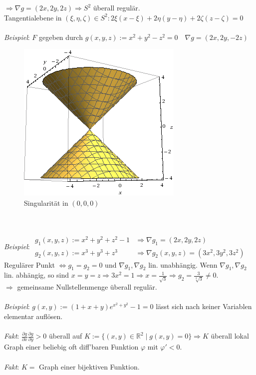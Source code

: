\documentclass[12pt,a4paper,titlepage]{article}
\renewcommand{\d}{\partial}
\newcommand{\setR}{\mathbb{R}}
\begin{document}
$\Rightarrow \nabla g=(2x,2y,2z) \Rightarrow S^2$ überall regulär. \\
Tangentialebene in $(\xi,\eta,\zeta)\in S^2: 2\xi(x-\xi)+2\eta(y-\eta)+2\zeta(z-\zeta)=0$ \\
\\
\newpage
\textit{Beispiel}: $F$ gegeben durch $g(x,y,z):=x^2+y^2-z^2=0 \quad \nabla g=(2x,2y,-2z)$
\begin{figure}[h!]
  \centering
  \includegraphics[keepaspectratio=true,scale=0.6]{WolframAlpha--plot_x_2_y_2_z_2_0__Surface_plot__2014_03_27_0446.png}
  \caption{Singularität in $(0,0,0)$}
\end{figure}\\
\\
\textit{Beispiel}: $\begin{array}{ll}g_1(x,y,z):=x^2+y^2+z^2-1 & \Rightarrow \nabla g_1=(2x,2y,2z)\\
  g_2(x,y,z):=x^3+y^3+z^3 & \Rightarrow \nabla g_2(x,y,z)=(3x^2,3y^2,3z^2)
\end{array}$ \\
Regulärer Punkt $\iff g_1=g_2=0$ und $\nabla g_1,\nabla g_2$ lin. unabhängig. Wenn $\nabla g_1,\nabla g_2$ lin. abhängig, so sind $x=y=z \Rightarrow 3x^2=1 \Rightarrow x=\frac{1}{\sqrt{3}} \Rightarrow g_2=\frac{3}{\sqrt[3]{3}}\neq 0$. \\
$\Rightarrow$ gemeinsame Nullstellenmenge überall regulär. \\
\\
\textit{Beispiel}: $g(x,y):=(1+x+y)e^{x^2+y^2}-1=0$ lässt sich nach keiner Variablen elementar auflösen. \\
\\
\textit{Fakt}: $\frac{\d g}{\d x}\frac{\d g}{\d y}>0$ überall auf $K:=\{(x,y)\in\setR^2\mid g(x,y)=0\} \Rightarrow K$ überall lokal Graph einer beliebig oft diff'baren Funktion $\varphi$ mit $\varphi'<0$. \\
\\
\textit{Fakt}: $K=$ Graph einer bijektiven Funktion.
\end{document}

